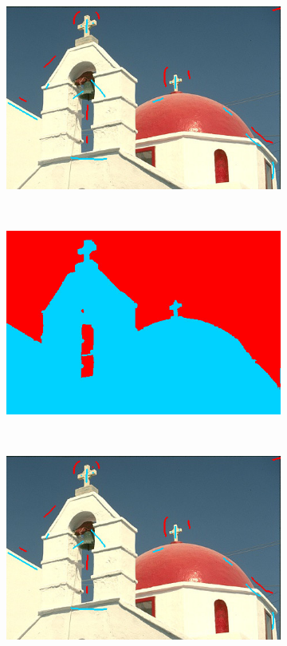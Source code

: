 \begin{figure}[htb]
\begin{subfigure}{0.4\textwidth}
 \end{subfigure}
 \\
 \begin{subfigure}{0.4\textwidth}	
\includegraphics[width=\textwidth]{images/evaluation/118035_seeds2.jpg}
 \end{subfigure}
 ~
 \begin{subfigure}{0.4\textwidth}	
\includegraphics[width=\textwidth]{images/evaluation/118035_res2.jpg}
 \end{subfigure}
 \\
 \begin{subfigure}{0.4\textwidth}	
\includegraphics[width=\textwidth]{images/evaluation/118035_seeds3.jpg}

\end{subfigure}
\end{figure}
